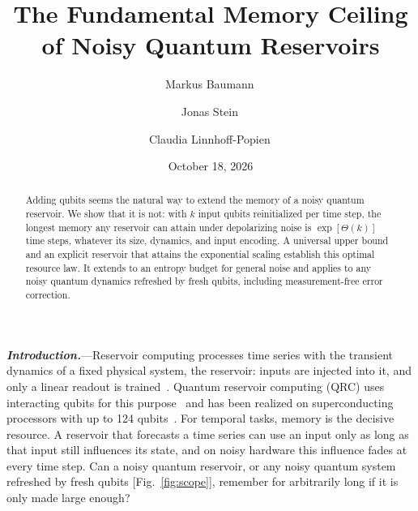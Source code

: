 \documentclass[aps,prl,twocolumn,superscriptaddress,floatfix]{revtex4-2}
\theoremstyle{plain}
\newcommand{\runin}[1]{\textit{\textbf{#1}}---}
\begin{document}
\let\SMaddcontentsline\addcontentsline
\renewcommand{\addcontentsline}[3]{}

\title{The Fundamental Memory Ceiling of Noisy Quantum Reservoirs}

\author{Markus Baumann\,}
\author{Jonas Stein\,}
\author{Claudia Linnhoff-Popien\,}

\date{October 18, 2026}

\begin{abstract}
Adding qubits seems the natural way to extend the memory of a noisy quantum reservoir. We show that it is not: with $k$ input qubits reinitialized per time step, the longest memory any reservoir can attain under depolarizing noise is $\exp[\Theta(k)]$ time steps, whatever its size, dynamics, and input encoding. A universal upper bound and an explicit reservoir that attains the exponential scaling establish this optimal resource law. It extends to an entropy budget for general noise and applies to any noisy quantum dynamics refreshed by fresh qubits, including measurement-free error correction.
\end{abstract}

\maketitle


\runin{Introduction.}Reservoir computing processes time series with the transient dynamics of a fixed physical system, the reservoir: inputs are injected into it, and only a linear readout is trained~\cite{Jaeger2001,Maass2002,JaegerHaas2004,Lukosevicius2009,Tanaka2019}. Quantum reservoir computing (QRC) uses interacting qubits for this purpose~\cite{Fujii2017,Nakajima2019,Mujal2021} and has been realized on superconducting processors with up to 124 qubits~\cite{Chen2020,Suzuki2022,Yasuda2023,Hu2024,Monzani2024,Dao2026}. For temporal tasks, memory is the decisive resource. A reservoir that forecasts a time series can use an input only as long as that input still influences its state, and on noisy hardware this influence fades at every time step. Can a noisy quantum reservoir, or any noisy quantum system refreshed by fresh qubits [Fig.~\ref{fig:scope}], remember for arbitrarily long if it is only made large enough?
\end{document}
